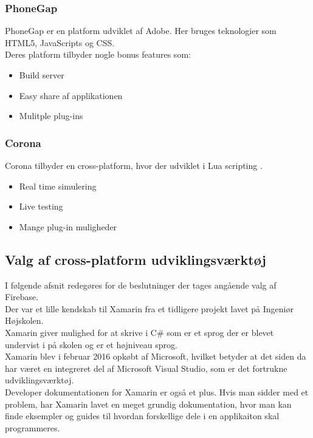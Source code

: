 \subsubsection{PhoneGap}
PhoneGap er en platform udviklet af Adobe\cite{Adobe}. Her bruges teknologier som HTML5\cite{HTML5}, JavaScripts\cite{JavaScript} og CSS\cite{CSS}. \\
Deres platform tilbyder nogle bonus features som:
\begin{itemize}[-]
	\item Build server
	\item Easy share af applikationen 
	\item Mulitple plug-ins
\end{itemize}

\clearpage

\subsubsection{Corona}
Corona tilbyder en cross-platform, hvor der udviklet i Lua scripting \cite{Lua}.
\begin{itemize}[-]
	\item Real time simulering
	\item Live testing
	\item Mange plug-in muligheder
\end{itemize}

\subsection{Valg af cross-platform udviklingsværktøj}
I følgende afsnit redegøres for de beslutninger der tages angående valg af Firebase. \\

Der var et lille kendskab til Xamarin fra et tidligere projekt lavet på Ingeniør Højskolen. \\
Xamarin giver mulighed for at skrive i C\# som er et sprog der er blevet undervist i på skolen og er et højniveau sprog. \\
Xamarin blev i februar 2016 opkøbt af Microsoft, hvilket betyder at det siden da har været en integreret del af Microsoft Visual Studio, som er det fortrukne udviklingsværktøj.\\
Developer dokumentationen for Xamarin er også et plus. Hvis man sidder med et problem, har Xamarin lavet en meget grundig dokumentation, hvor man kan finde eksempler og guides til hvordan forskellige dele i en applikaiton skal programmeres.

